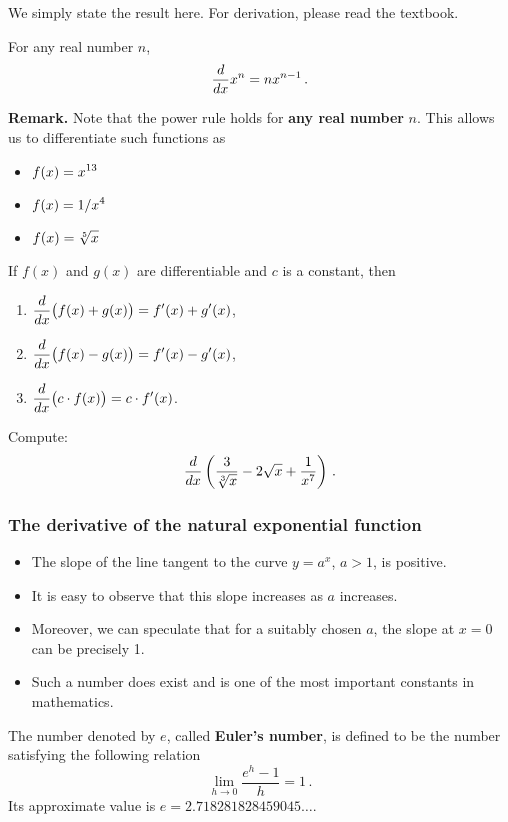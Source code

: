 \documentclass[10pt,t,presentation,ignorenonframetext,aspectratio=169]{beamer}
\begin{document}
\begin{frame}
  \vs
  We simply state the result here. For derivation, please read the textbook.
  \begin{thm}
    For any real number $n$,
    \[
      \frac{d}{\mathop{}\!d x} x^n = n x^{n-1} \,.
    \]
  \end{thm}

  \vs
  \textbf{Remark.} Note that the power rule holds for \textbf{any real
    number} $n$. This allows us to differentiate such functions as
  \begin{itemize}
  \item $\displaystyle f(x) = x^{13}$
  \item $\displaystyle f(x) = 1/x^4$
  \item $\displaystyle f(x) = \sqrt[5]{x}$
  \end{itemize}
\end{frame}

\begin{frame}
  \vs
  \begin{thm}
    If $f(x)$ and $g(x)$ are differentiable and $c$ is a constant, then
    \begin{enumerate}
    \item\label{SR:1} $\displaystyle \frac{d}{\mathop{}\!d x} \big( f(x) + g(x)\big) = f'(x) + g'(x)$,
    \item $\displaystyle \frac{d}{\mathop{}\!d x} \big( f(x) - g(x)\big) = f'(x) - g'(x)$,
    \item $\displaystyle \frac{d}{\mathop{}\!d x} \big(c\cdot f(x)\big) = c\cdot f'(x)$.
    \end{enumerate}
  \end{thm}

  \vs
  \begin{question}
    Compute:
    \[
      \frac{d}{\mathop{}\!d x} \left(
        \frac{3}{\sqrt[3]{x}} - 2\sqrt{x} + \frac{1}{x^7}
      \right) \,.
    \]
  \end{question}
\end{frame}

\begin{frame}
  \frametitle{The derivative of the natural exponential function}
  \begin{itemize}
  \item The slope of the line tangent to the  curve $y =
    a^x$, $a > 1$, is positive.
  \item It is easy to observe that this slope increases as $a$
    increases.
  \item Moreover, we can speculate that for a suitably chosen $a$, the
    slope at $x = 0$ can be precisely 1.
  \item Such a number does exist and is one of the most important constants in mathematics.
  \end{itemize}

  \begin{defn}
    The number denoted by $e$, called \textbf{Euler's number}, is defined to be the number satisfying the following relation
    \[
      \lim_{h \to 0} \frac{e^h - 1}{h} = 1 \,.
    \]
    Its approximate value is $e = 2.718281828459045 \dots$.
  \end{defn}
\end{frame}
\end{document}
